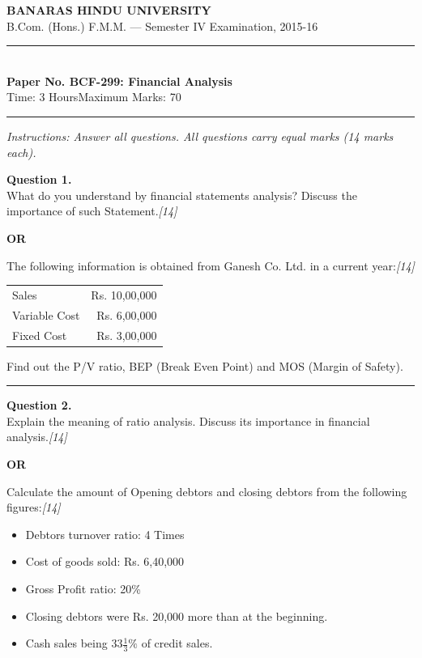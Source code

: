 \documentclass[11pt,a4paper]{article}
\newcommand{\pts}[1]{\hfill   \textit{[#1]}}
\begin{document}
\begin{center}
  {\large\bfseries BANARAS HINDU UNIVERSITY}\\[2pt]
  {\normalsize B.Com. (Hons.) F.M.M. --- Semester IV Examination, 2015-16}\\[6pt]
  \rule{0.8\linewidth}{0.5pt}\\[6pt]
  {\large\bfseries Paper No. BCF-299: Financial Analysis}\\[4pt]
  {\normalsize Time: 3 Hours\hfill Maximum Marks: 70}
\end{center}

\rule{\linewidth}{0.4pt}

\smallskip



\noindent   \textit{Instructions: Answer all questions. All questions carry equal marks (14 marks each).}

\bigskip




\noindent   \textbf{Question 1.} \\
What do you understand by financial statements analysis? Discuss the importance of such Statement.\pts{14}

\centerline{   \textbf{OR}}

The following information is obtained from Ganesh Co. Ltd. in a current year:\pts{14}

\begin{center}
\renewcommand{\arraystretch}{1.1}

\begin{tabular}{lr}
  Sales & Rs. 10,00,000 \\
  Variable Cost & Rs. 6,00,000 \\
  Fixed Cost & Rs. 3,00,000 \\
\end{tabular}
\end{center}
Find out the P/V ratio, BEP (Break Even Point) and MOS (Margin of Safety).

\medskip\rule{\linewidth}{0.2pt}




\noindent   \textbf{Question 2.} \\
Explain the meaning of ratio analysis. Discuss its importance in financial analysis.\pts{14}

\centerline{   \textbf{OR}}

Calculate the amount of Opening debtors and closing debtors from the following figures:\pts{14}

\begin{itemize}[itemsep=2pt,topsep=2pt]
  \item Debtors turnover ratio: 4 Times
  \item Cost of goods sold: Rs. 6,40,000
  \item Gross Profit ratio: 20\%
  \item Closing debtors were Rs. 20,000 more than at the beginning.
  \item Cash sales being $33\frac{1}{3}\%$ of credit sales.
\end{itemize}
\end{document}
